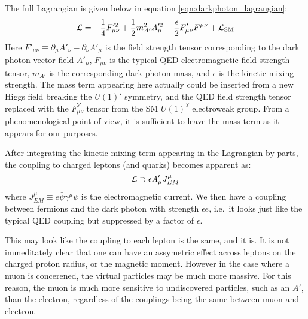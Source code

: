 The full Lagrangian is given below in equation \ref{eqn:darkphoton_lagrangian}:
\begin{equation}
\label{eqn:darkphoton_lagrangian}
\operatorname{\mathcal{L}} = -\frac{1}{4}F'^2_{\mu\nu} + \frac{1}{2}m_{A'}^2 A'^2_\mu - \frac{\epsilon}{2}F'_{\mu\nu} F^{\mu\nu} + \operatorname{\mathcal{L}}_{\textrm{SM}}
\end{equation}
Here $F'_{\mu\nu} \equiv \partial_\mu A'_\nu - \partial_\nu A'_\mu$ is the field strength tensor corresponding to the dark photon vector field $A'_\mu$, $F_{\mu\nu}$ is the typical QED electromagnetic field strength tensor, $m_{A'}$ is the corresponding dark photon mass, and $\epsilon$ is the kinetic mixing strength.
The mass term appearing here actually could be inserted from a new Higgs field breaking the $U(1)'$ symmetry, and the QED field strength tensor replaced with the $F^Y_{\mu\nu}$ tensor from the SM $U(1)^Y$ electroweak group.
From a phenomenological point of view, it is sufficient to leave the mass term as it appears for our purposes.

After integrating the kinetic mixing term appearing in the Lagrangian by parts, the coupling to charged leptons (and quarks) becomes apparent as:
\begin{equation}
    \label{eqn:darkphoton_qed_current}
    \operatorname{\mathcal{L}} \supset \epsilon A'_\mu J^\mu_{EM}
\end{equation}
where $J^\mu_{EM} \equiv e \bar{\psi} \gamma^\mu \psi$ is the electromagnetic current.
We then have a coupling between fermions and the dark photon with strength $\epsilon e$, i.e.\ it looks just like the typical QED coupling but suppressed by a factor of $\epsilon$.

This may look like the coupling to each lepton is the same, and it is.
It is not immeditately clear that one can have an assymetric effect across leptons on the charged proton radius, or the magnetic moment.
However in the case where a muon is concerened, the virtual particles may be much more massive.
For this reason, the muon is much more sensitive to undiscovered particles, such as an $A'$, than the electron, regardless of the couplings being the same between muon and electron.
